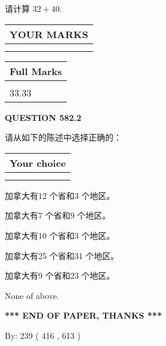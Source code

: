 \documentclass{ctexart}
\begin{document}
  
 
请计算 $ %
32 +  %
40 $.
 

 

 
  
\vspace{0.2in}
  
\noindent\begin{tabular}{|l|}
\hline
 YOUR MARKS  \\
\hline
 \\ 
 \\ 
\hline
\end{tabular}
\hspace{0.05in} \begin{tabular}{|l|}
\hline
 Full Marks  \\
\hline
 \\ 
33.33 \\
\hline
\end{tabular}
{\textbf{\Large{QUESTION
582.2 
}}}
  
  
请从如下的陈述中选择正确的：
  
  
\noindent\hspace{3.0in} \begin{tabular}{|l|}
\hline
Your choice \\
\hline
 \\ 
 \\ 
\hline
\end{tabular}
  
  
 
 
加拿大有12 个省和3 个地区。
 
 
加拿大有7 个省和9 个地区。
 
 
加拿大有10 个省和3 个地区。
 
 
加拿大有25 个省和31 个地区。
 
 
加拿大有9 个省和23 个地区。
 
 
 None of above.
 
 
   
   
 \vspace{0.2in}
 
   
   
   
   
\vspace{1.0in} 
{\textbf{\large{ *** END OF PAPER, THANKS *** }}} 
   
   
\hspace{1.0in} By: 
 239 ( 416 ,  613 )
   
\end{document}
